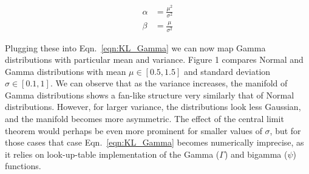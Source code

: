 \begin{align}
	\alpha &= \frac{\mu^2}{\sigma^2}\\
	\beta &= \frac{\mu}{\sigma^2}
\end{align}

Plugging these into Eqn.\ \eqref{eqn:KL_Gamma} we can now map Gamma distributions with particular mean and variance. Figure 1 compares Normal and Gamma distributions with mean $\mu\in[0.5,1.5]$ and standard deviation $\sigma\in[0.1,1]$. We can observe that as the variance increases, the manifold of Gamma distributions shows a fan-like structure very similarly that of Normal distributions. However, for larger variance, the distributions look less Gaussian, and the manifold becomes more asymmetric. The effect of the central limit theorem would perhaps be even more prominent for smaller values of $\sigma$, but for those cases that case Eqn.\ \eqref{eqn:KL_Gamma} becomes numerically imprecise, as it relies on look-up-table implementation of the Gamma ($\Gamma$) and bigamma ($\psi$) functions.
